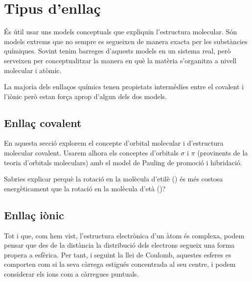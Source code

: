 \section{Tipus d'enllaç}
És útil usar uns models conceptuals que expliquin l'estructura molecular. Són models extrems que no sempre es segueixen de manera exacta per les substàncies químiques. Sovint tenim barreges d'aquests models en un sistema real, però serveixen per conceptualitzar la manera en què la matèria s'organitza a nivell molecular i atòmic.

La majoria dels enllaços químics tenen propietats intermèdies entre el covalent i l'iònic però estan força aprop d'algun dels dos models.

\subsection{Enllaç covalent}


\begin{mdframed}[backgroundcolor=gray!30,frametitle=Estructura molecular i enllaç covalent]
En aquesta secció explorem el concepte d'orbital molecular i d'estructura molecular covalent. Usarem alhora els conceptes d'orbitals $\sigma$ i $\pi$ (provinents de la teoria d'orbitals moleculars) amb el model de Pauling de promoció i hibridació.
\end{mdframed}

\begin{exr}
Sabries explicar perquè la rotació en la molècula d'etilè () és més costosa energèticament que la rotació en la molècula d'età ()?
\end{exr}

\subsection{Enllaç iònic}

Tot i que, com hem vist, l'estructura electrònica d'un àtom és complexa, podem pensar que des de la distància la distribució dels electrons segueix una forma propera a esfèrica. Per tant, i seguint la llei de Coulomb, aquestes esferes es comporten com si la seva càrrega estigués concentrada al seu centre, i podem considerar els ions com a càrregues puntuals.

